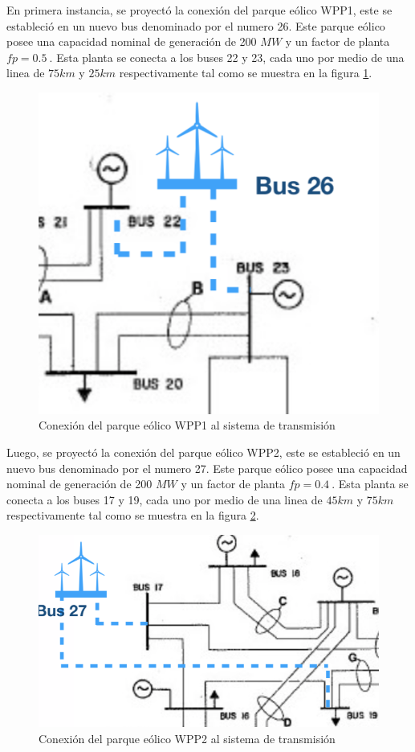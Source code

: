 \documentclass{article}
\begin{document}
En primera instancia, se proyectó la conexión del parque eólico WPP1, este se estableció en un nuevo bus denominado por el numero 26. Este parque eólico posee una capacidad nominal de generación de 200 $MW$ y un factor de planta $fp=0.5~$. Esta planta se conecta a los buses 22 y 23, cada uno por medio de una linea de $75 km$ y $25km$ respectivamente tal como se muestra en la figura \ref{WPP1}.  
\begin{figure}[H]
    \centering
    \includegraphics[scale=0.7]{ParqueEolico1.png}
    \caption{Conexión del parque eólico WPP1 al sistema de transmisión}
    \label{WPP1}
\end{figure}
Luego, se proyectó la conexión del parque eólico WPP2, este se estableció en un nuevo bus denominado por el numero 27. Este parque eólico posee una capacidad nominal de generación de 200 $MW$ y un factor de planta $fp=0.4~$. Esta planta se conecta a los buses 17 y 19, cada uno por medio de una linea de $45 km$ y $75km$ respectivamente tal como se muestra en la figura \ref{WPP2}. 
\begin{figure}[H]
    \centering
    \includegraphics[scale=0.7]{ParqueEolico2.png}
    \caption{Conexión del parque eólico WPP2 al sistema de transmisión}
    \label{WPP2}
\end{figure}
\end{document}
